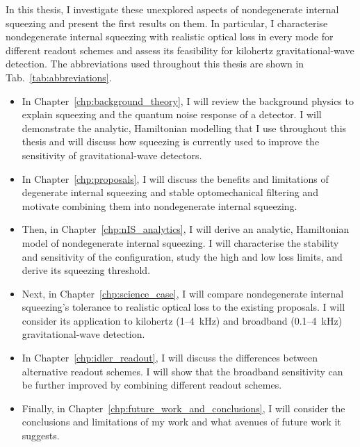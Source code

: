 In this thesis, I investigate these unexplored aspects of nondegenerate internal squeezing and present the first results on them. In particular, I characterise nondegenerate internal squeezing with realistic optical loss in every mode for different readout schemes and assess its feasibility for kilohertz gravitational-wave detection. The abbreviations used throughout this thesis are shown in Tab.~\ref{tab:abbreviations}.
\begin{itemize}
\itemsep0em 
\item In Chapter~\ref{chp:background_theory}, I will review the background physics to explain squeezing and the quantum noise response of a detector. I will demonstrate the analytic, Hamiltonian modelling that I use throughout this thesis and will discuss how squeezing is currently used to improve the sensitivity of gravitational-wave detectors. %
\item In Chapter~\ref{chp:proposals}, I will discuss the benefits and limitations of degenerate internal squeezing and stable optomechanical filtering and motivate combining them into nondegenerate internal squeezing.
\item Then, in Chapter~\ref{chp:nIS_analytics}, I will derive an analytic, Hamiltonian model of nondegenerate internal squeezing. I will characterise the stability and sensitivity of the configuration, study the high and low loss limits, and derive its squeezing threshold. %
\item Next, in Chapter~\ref{chp:science_case}, I will compare nondegenerate internal squeezing's tolerance to realistic optical loss to the existing proposals. I will consider its application to kilohertz (1--4~kHz) and broadband (0.1--4~kHz) gravitational-wave detection.
\item In Chapter~\ref{chp:idler_readout}, I will discuss the differences between alternative readout schemes. I will show that the broadband sensitivity can be further improved by combining different readout schemes. %
\item Finally, in Chapter~\ref{chp:future_work_and_conclusions}, I will consider the conclusions and limitations of my work and what avenues of future work it suggests.
\end{itemize}





